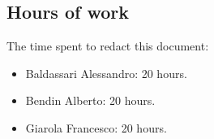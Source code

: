 \documentclass[a4paper,11pt]{report} %
\begin{document}
	\subsection{Hours of work} The time spent to redact this document:
	\begin{itemize}
		\item Baldassari Alessandro: 20 hours.
		\item Bendin Alberto: 20 hours.
		\item Giarola Francesco: 20 hours.
	\end{itemize}
\end{document}
